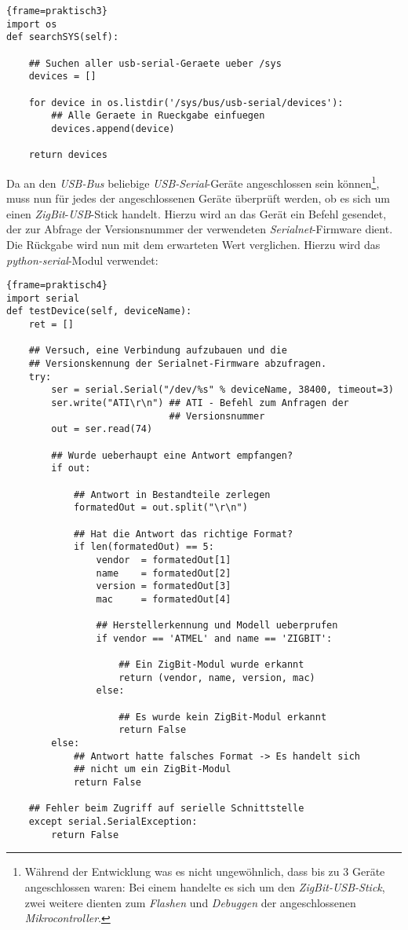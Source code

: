 \begin{lstlisting}{frame=praktisch3}
import os
def searchSYS(self):

    ## Suchen aller usb-serial-Geraete ueber /sys 
    devices = []

    for device in os.listdir('/sys/bus/usb-serial/devices'):
        ## Alle Geraete in Rueckgabe einfuegen
        devices.append(device)

    return devices
\end{lstlisting}

Da an den \emph{USB-Bus} beliebige \emph{USB-Serial}-Geräte angeschlossen sein können\footnote{Während der Entwicklung
was es nicht ungewöhnlich, dass bis zu 3 Geräte angeschlossen waren: Bei einem handelte es sich um den
\emph{ZigBit-USB-Stick}, zwei weitere dienten zum \emph{Flashen} und \emph{Debuggen} der angeschlossenen 
\emph{Mikrocontroller}.}, 
muss nun für jedes der angeschlossenen Geräte überprüft werden, ob es sich um einen \emph{ZigBit}-\emph{USB}-Stick
handelt. Hierzu wird an das Gerät ein Befehl gesendet, der zur Abfrage der Versionsnummer der verwendeten
\emph{Serialnet}-Firmware dient. Die Rückgabe wird nun mit dem erwarteten Wert verglichen. Hierzu wird das
\emph{python-serial}-Modul verwendet:

\begin{lstlisting}{frame=praktisch4}
import serial
def testDevice(self, deviceName):
    ret = []

    ## Versuch, eine Verbindung aufzubauen und die 
    ## Versionskennung der Serialnet-Firmware abzufragen. 
    try:
        ser = serial.Serial("/dev/%s" % deviceName, 38400, timeout=3)
        ser.write("ATI\r\n") ## ATI - Befehl zum Anfragen der
                             ## Versionsnummer
        out = ser.read(74)
        
        ## Wurde ueberhaupt eine Antwort empfangen? 
        if out:

            ## Antwort in Bestandteile zerlegen
            formatedOut = out.split("\r\n")

            ## Hat die Antwort das richtige Format?
            if len(formatedOut) == 5:
                vendor  = formatedOut[1]
                name    = formatedOut[2]
                version = formatedOut[3]
                mac     = formatedOut[4]

                ## Herstellerkennung und Modell ueberprufen
                if vendor == 'ATMEL' and name == 'ZIGBIT':

                    ## Ein ZigBit-Modul wurde erkannt
                    return (vendor, name, version, mac)
                else:

                    ## Es wurde kein ZigBit-Modul erkannt
                    return False
        else:
            ## Antwort hatte falsches Format -> Es handelt sich
            ## nicht um ein ZigBit-Modul
            return False

    ## Fehler beim Zugriff auf serielle Schnittstelle
    except serial.SerialException:
        return False
\end{lstlisting}

